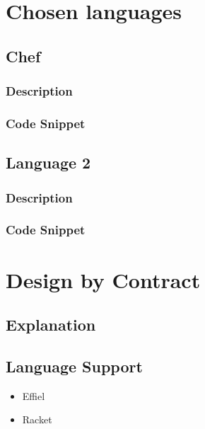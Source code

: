 \documentclass[12pt]{article}
\begin{document}
\section{Chosen languages \hfill {}}
\subsection{Chef}
\subsubsection{Description}
\subsubsection{Code Snippet}
\subsection{Language 2}
\subsubsection{Description}
\subsubsection{Code Snippet}

\section{Design by Contract \hfill {}}
\subsection{Explanation}
\subsection{Language Support}
\begin{itemize}
    \item Effiel
    \cite{Question4Point2}
    \item Racket
    \cite{Question4Point1}
\end{itemize}
\newpage



\end{document}
